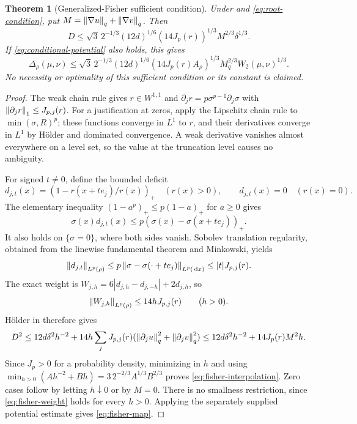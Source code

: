 \documentclass[11pt]{article}
\numberwithin{equation}{section}
\newtheorem{theorem}{Theorem}[section]
\theoremstyle{remark}\newtheorem{remark}[theorem]{Remark}
\begin{document}
\begin{theorem}[Generalized-Fisher sufficient condition]\label{thm:fisher}
Under  and \eqref{eq:root-condition}, put
$M=\left\lVert\nabla u\right\rVert_q+\left\lVert\nabla v\right\rVert_q$. Then
\begin{equation}\label{eq:fisher-interpolation}
 D\le\sqrt3\,2^{-1/3}(12d)^{1/6}(14J_p(r))^{1/3}
                  M^{2/3}\delta^{1/3}.
\end{equation}
If \eqref{eq:conditional-potential} also holds, this gives
\begin{equation}\label{eq:fisher-map}
 \Delta_\rho(\mu,\nu)
 \le\sqrt3\,2^{-1/3}(12d)^{1/6}(14J_p(r)A_\rho)^{1/3}
                  M_q^{2/3}W_2(\mu,\nu)^{1/3}.
\end{equation}
No necessity or optimality of this sufficient condition or its constant is claimed.
\end{theorem}
\begin{proof}
The weak chain rule gives $r\in W^{1,1}$ and
$\partial_jr=p\sigma^{p-1}\partial_j\sigma$ with
$\left\lVert\partial_jr\right\rVert_1\le J_{p,j}(r)$.
For a justification at zeros, apply the Lipschitz chain rule to $\min(\sigma,R)^p$; these functions converge in $L^1$ to $r$, and their derivatives converge in $L^1$ by H\"older and dominated convergence. A weak derivative vanishes almost everywhere on a level set, so the value at the truncation level causes no ambiguity.

For signed $t\ne0$, define the bounded deficit
\[
 d_{j,t}(x)=(1-r(x+te_j)/r(x))_+\quad(r(x)>0),
 \qquad d_{j,t}(x)=0\quad(r(x)=0).
\]
The elementary inequality $(1-a^p)_+\le p(1-a)_+$ for $a\ge0$ gives
\[
 \sigma(x)d_{j,t}(x)
 \le p(\sigma(x)-\sigma(x+te_j))_+.
\]
It also holds on $\{\sigma=0\}$, where both sides vanish. Sobolev translation regularity, obtained from the linewise fundamental theorem and Minkowski, yields
\[
 \left\lVert d_{j,t}\right\rVert_{L^p(\rho)}
 \le p\left\lVert\sigma-\sigma(\cdot+te_j)\right\rVert_{L^p(\,\mathrm d x)}
 \le |t|J_{p,j}(r).
\]
The exact weight is $W_{j,h}=6|d_{j,h}-d_{j,-h}|+2d_{j,h}$, so
\begin{equation}\label{eq:fisher-weight}
 \left\lVert W_{j,h}\right\rVert_{L^p(\rho)}\le14hJ_{p,j}(r)
 \qquad(h>0).
\end{equation}
H\"older in  therefore gives
\[
 D^2\le12d\delta^2h^{-2}
   +14h\sum_jJ_{p,j}(r)(\left\lVert\partial_ju\right\rVert_q^2+\left\lVert\partial_jv\right\rVert_q^2)
 \le12d\delta^2h^{-2}+14J_p(r)M^2h.
\]
Since $J_p>0$ for a probability density, minimizing in $h$ and using
$\min_{h>0}(Ah^{-2}+Bh)=3\,2^{-2/3}A^{1/3}B^{2/3}$ proves \eqref{eq:fisher-interpolation}. Zero cases follow by letting $h\downarrow0$ or by $M=0$. There is no smallness restriction, since \eqref{eq:fisher-weight} holds for every $h>0$. Applying the separately supplied potential estimate gives \eqref{eq:fisher-map}.
\end{proof}
\end{document}
